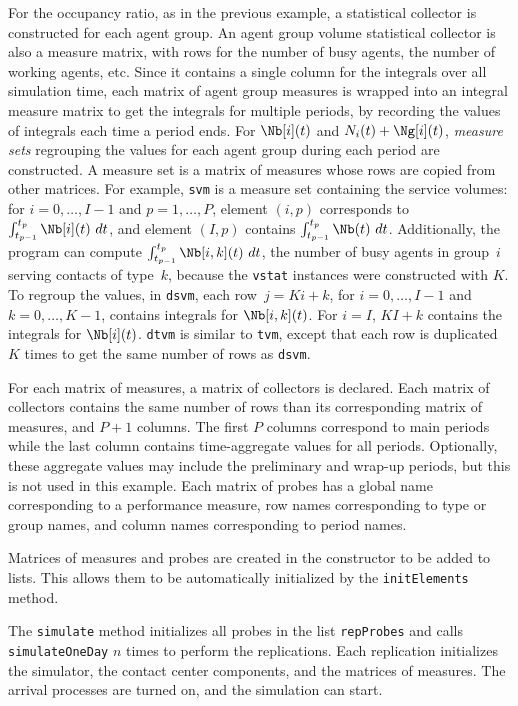 For the occupancy ratio, as in the previous example, a statistical
collector is constructed for each agent group. An agent group
volume statistical collector is also
a measure matrix, with rows for the number of busy agents, the
number of working agents, etc.
Since it contains a single column for the integrals over all
simulation time, each matrix of agent group measures
is wrapped into an integral measure matrix to get the integrals
for multiple periods, by recording the values of integrals each time a
period ends.
For $\Nb[i](t)$ and $N_i(t)+\Ng[i](t)$, \emph{measure sets} regrouping
the values for each agent group during each period are constructed.
A measure set is a matrix of measures whose rows are copied from other
matrices.
For example, \texttt{svm} is a measure set containing
the service volumes: for $i=0,\ldots,I-1$ and $p=1,\ldots,P$,
element $(i, p)$ corresponds to $\int_{t_{p-1}}^{t_p} \Nb[i](t)\ dt$,
and element $(I, p)$ contains $\int_{t_{p-1}}^{t_p} \Nb(t)\ dt$.
Additionally, the program can compute
$\int_{t_{p-1}}^{t_p}\Nb[i, k](t)\ dt$, the
number of busy agents in group~$i$ serving contacts of type~$k$,
because the \texttt{vstat} instances were constructed with $K$.  To
regroup the values, in
\texttt{dsvm}, each row~$j=Ki+k$, for $i=0,\ldots,I-1$ and
$k=0,\ldots,K-1$, contains integrals for $\Nb[i, k](t)$.  For $i=I$,
$KI+k$ contains the integrals for $\Nb[i](t)$.
\texttt{dtvm} is similar to \texttt{tvm}, except that each row is
duplicated $K$ times to get the same number of rows as \texttt{dsvm}.

For each matrix of measures, a matrix of collectors is declared.  Each
matrix of collectors contains the same number of rows than its
corresponding matrix of measures, and $P+1$ columns.  The first $P$
columns correspond to main periods while the last column contains
time-aggregate values for all periods.  Optionally, these
aggregate values may include the preliminary and wrap-up periods, but
this is not used in this example.
Each matrix of probes has a global name corresponding to a performance
measure, row names corresponding to type or group names, and column
names corresponding to period names.

Matrices of measures and probes are created in the
constructor to be added to lists.  This allows them to be
automatically initialized by the \texttt{init\-Elements} method.

The \texttt{simulate} method initializes all probes in the list
\texttt{rep\-Probes} and calls \texttt{simulate\-One\-Day} $n$ times
to perform the replications.  Each replication initializes the
simulator, the contact center components, and the matrices of
measures.  The arrival processes are turned on, and the simulation can
start.

